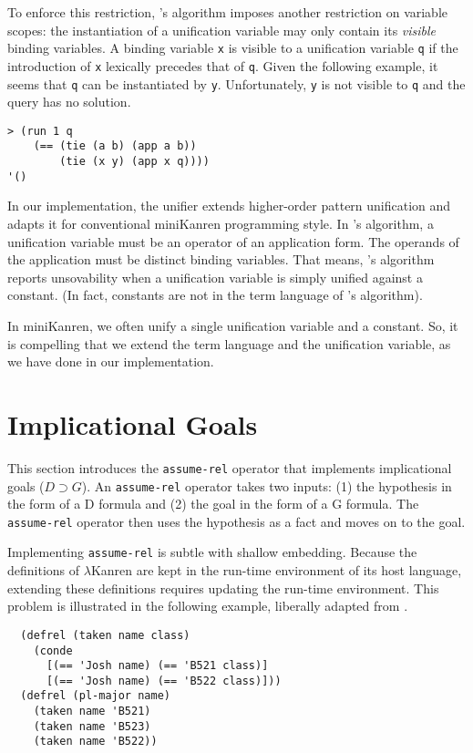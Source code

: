 \documentclass[acmlarge,review]{acmart}
\theoremstyle{definition}
\begin{document}
To enforce this restriction, \citet{miller_logic_1991}'s algorithm
imposes another restriction on variable scopes: the instantiation of a
unification variable may only contain its \emph{visible} binding variables.
A binding variable \texttt{x} is visible to a unification variable \texttt{q} if
the introduction of \texttt{x} lexically precedes that of \texttt{q}.
Given the following example, it seems that \texttt{q} can be instantiated by
\texttt{y}. Unfortunately, \texttt{y} is not visible to \texttt{q} and the
query has no solution.
\begin{lstlisting}
> (run 1 q
    (== (tie (a b) (app a b))
        (tie (x y) (app x q))))
'()
\end{lstlisting}

In our implementation, the unifier extends higher-order pattern unification
and adapts it for conventional miniKanren programming style.
In \citet{miller_logic_1991}'s algorithm, a unification variable must be an
operator of an application form. The operands of the application must be distinct
binding variables. That means, \citet{miller_logic_1991}'s algorithm reports
unsovability when a unification variable is simply unified against a constant.
(In fact, constants are not in the term language of
\citet{miller_logic_1991}'s algorithm).

In miniKanren, we often unify a single unification variable and a constant.
So, it is compelling that we extend the term language and the unification variable,
as we have done in our implementation.

\section{Implicational Goals}
This section introduces the \texttt{assume-rel} operator that implements
implicational goals ($D \supset G$).
An \texttt{assume-rel} operator takes two inputs: (1) the hypothesis in
the form of a D formula and (2) the goal in the form of a G formula.
The \texttt{assume-rel} operator then uses the hypothesis as a fact and
moves on to the goal.

Implementing \texttt{assume-rel} is subtle with shallow embedding.
Because the definitions of $\lambda$Kanren are kept in the run-time environment
of its host language, extending these definitions requires updating
the run-time environment. This problem is illustrated in the following
example, liberally adapted from \citet[p.~80]{miller_programming_2012}.

\begin{lstlisting}
  (defrel (taken name class)
    (conde
      [(== 'Josh name) (== 'B521 class)]
      [(== 'Josh name) (== 'B522 class)]))
  (defrel (pl-major name)
    (taken name 'B521)
    (taken name 'B523)
    (taken name 'B522))
\end{lstlisting}
\end{document}
